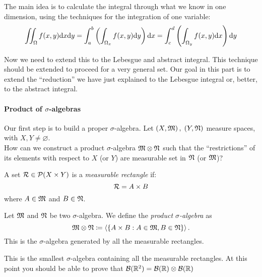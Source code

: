 \begin{figure}[htpb]
\end{figure}
\FloatBarrier

The main idea is to calculate the integral through what we know in one dimension, using the techniques for the integration of one variable:
$$\iint_\Omega f(x,y) \mathrm d x \mathrm d y=\int_a^b \left( \int_{\Omega_x} f(x,y) \mathrm d y \right) \mathrm d x=\int_c^d \left( \int_{\Omega_y} f(x,y) \mathrm d x \right) \mathrm d y$$

Now we need to extend this to the Lebesgue and abstract integral. This technique should be extended to proceed for a very general set. Our goal in this part is to extend the ``reduction'' we have just explained to the Lebesgue integral or, better, to the abstract integral.

\paragraph{Product of $\sigma$-algebras} Our first step is to build a proper $\sigma$-algebra. Let $\left( X, \mathfrak M \right), \; \left(Y, \mathfrak N\right)$ measure spaces, with $X,Y \neq \varnothing$.\\
How can we construct a product $\sigma$-algebra $\mathfrak M\otimes\mathfrak N$ such that the ``restrictions'' of its elements with respect to $X$ (or $Y$) are measurable set in $\mathfrak N$ (or $\mathfrak M$)?

\begin{defn}
	A set $\mathcal R \in \mathcal P (X \times Y)$ is a \emph{measurable rectangle} if:
	$$\mathcal R = A \times B$$
	where $A\in \mathfrak M$ and $B \in \mathfrak N$.
\end{defn}

\begin{defn}
	Let $\mathfrak M $ and $\mathfrak N$ be two $\sigma$-algebra. We define the \emph{product $\sigma$-algebra} as 
	$$\mathfrak M \otimes \mathfrak N \coloneqq \left\langle\{A \times B : A \in \mathfrak M, B \in \mathfrak N \}\right\rangle.$$
	This is the $\sigma$-algebra generated by all the measurable rectangles.
\end{defn}
This is the smallest $\sigma$-algebra containing all the measurable rectangles.
At this point you should be able to prove that $ \mathcal B(\mathbb R^2) = \mathcal B(\mathbb R) \otimes \mathcal B(\mathbb R)$

